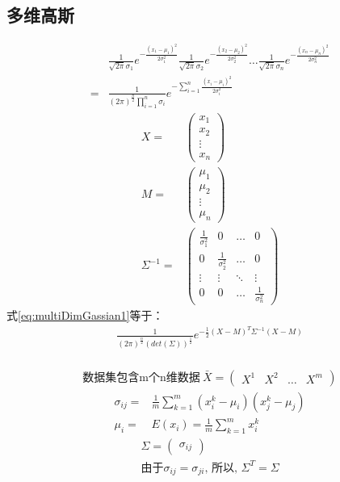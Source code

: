 \subsection{多维高斯}
\begin{align}
    \label{eq:multiDimGassian1}
    &\frac{1}{\sqrt{2\pi}\sigma_{1}}e^{-\frac{(x_{1}-\mu_{1})^2}{2\sigma_{1}^2}}
    \frac{1}{\sqrt{2\pi}\sigma_{2}}e^{-\frac{(x_{2}-\mu_{2})^2}{2\sigma_{2}^2}}
    \dots
    \frac{1}{\sqrt{2\pi}\sigma_{n}}e^{-\frac{(x_{n}-\mu_{n})^2}{2\sigma_{n}^2}}\\
    =&\frac{1}{(2\pi)^{\frac{n}{2}}\prod_{i=1}^{n}\sigma_{i}}e^{-\sum_{i=1}^{n}\frac{(x_{i}-\mu_{i})^2}{2\sigma_{i}^2}}
\end{align}
\begin{align}
    X =&
    \begin{pmatrix}
        x_{1}\\
        x_{2}\\
        \vdots\\
        x_{n}
    \end{pmatrix}\\
    M =&
    \begin{pmatrix}
        \mu_{1}\\
        \mu_{2}\\
        \vdots\\
        \mu_{n}
    \end{pmatrix}\\
    \Sigma^{-1} =&
    \begin{pmatrix}
        \frac{1}{\sigma_{1}^2} & 0 & \dots & 0\\
        0 & \frac{1}{\sigma_{2}^2} & \dots & 0\\
        \vdots & \vdots & \ddots & \vdots\\
        0 & 0 & \dots & \frac{1}{\sigma_{n}^2}
    \end{pmatrix}
\end{align}
式\ref{eq:multiDimGassian1}等于：
\begin{align}
    \label{eq:multiDimGassian2}
    \frac{1}{(2\pi)^{\frac{n}{2}}(det(\Sigma))^{\frac{1}{2}}}e^{-\frac{1}{2}(X-M)^T\Sigma^{-1}(X-M)}
\end{align}
\\
\begin{align}
    \text{数据集包含m个n维数据}\ 
    \bar{X}=\begin{pmatrix}
        X^{1} & X^{2} & \dots & X^{m}
    \end{pmatrix}
\end{align}
\begin{align}
    \sigma_{ij} =& \frac{1}{m}\sum_{k=1}^{m}(x_{i}^{k}-\mu_{i})(x_{j}^{k}-\mu_{j})\\
    \mu_{i}=&E(x_{i})= \frac{1}{m}\sum_{k=1}^{m}x_{i}^{k}
\end{align}
\begin{gather}
    \Sigma = \begin{pmatrix}
        \sigma_{ij}
    \end{pmatrix}\\
    \text{由于}\sigma_{ij}=\sigma_{ji}\text{, 所以, }\Sigma^{T}=\Sigma
\end{gather}


